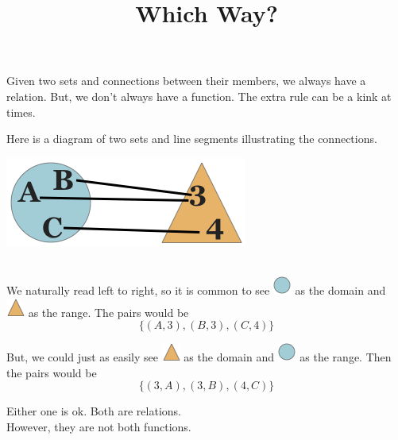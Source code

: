 \documentclass{ximera}
\title{Which Way?}
\begin{document}
\begin{abstract}
\end{abstract}

\maketitle





Given two sets and connections between their members, we always have a relation. But, we don't always have a function. The extra rule can be a kink at times. 


\begin{example}
Here is a diagram of two sets and line segments illustrating the connections.

\begin{center}

\includegraphics{pics/func.png}

\end{center}
\quad \\


We naturally read left to right, so it is common to see \includegraphics{pics/circle.png} as the domain and \includegraphics{pics/triangle.png} as the range.  The pairs would be 
\[
\{ (A, 3), (B, 3), (C, 4) \}
\]


But, we could just as easily see \includegraphics{pics/triangle.png} as the domain and \includegraphics{pics/circle.png} as the range.  Then the pairs would be
\[
\{ (3, A), (3, B), (4, C) \}
\]


Either one is ok. Both are relations. \\
However, they are not both functions. \\
\quad \\


\end{example}
\end{document}
